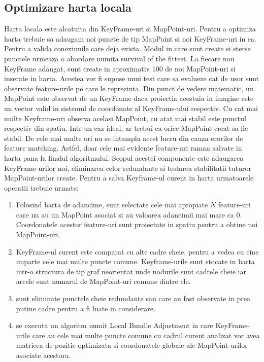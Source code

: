 \documentclass[12pt,a4paper]{report}
\begin{document}
\subsection{Optimizare harta locala}
Harta locala este alcatuita din KeyFrame-uri si MapPoint-uri. Pentru a optimiza
harta trebuie sa adaugam noi puncte de tip MapPoint si noi KeyFrame-uri in ea.
Pentru a valida conexiunile care deja exista. Modul in care sunt create si sterse 
punctele urmeaza o abordare numita survival of the fittest. La fiecare nou KeyFrame 
adaugat, sunt create in aproximativ 100 de noi MapPoint-uri si inserate in harta. Acestea
vor fi supuse unui test care sa evalueze cat de usor sunt observate feature-urile pe care
le reprezinta.  Din punct de vedere matematic, un MapPoint este observat de un KeyFrame
daca proiectia acestuia in imagine este un vector valid in sistemul de coordonate 
al KeyFrame-ului respectiv. Cu cat mai multe Keyframe-uri observa acelasi MapPoint,
cu atat mai stabil este punctul respectiv din spatiu. Intr-un caz ideal, ar trebui ca
orice MapPoint creat sa fie stabil. De cele mai multe ori nu se intampla acest lucru din
cauza erorilor de feature matching. Astfel, doar cele mai evidente feature-uri raman 
salvate in harta pana la finalul algoritmului. Scopul acestei componente este adaugarea 
KeyFrame-urilor noi, eliminarea celor redundante si testarea stabilitatii tuturor MapPoint-urilor
create. Pentru a salva Keyframe-ul curent in harta urmatoarele operatii trebuie urmate:
\begin{enumerate}
    \item Folosind harta de adancime, sunt selectate cele mai apropiate \( N \) feature-uri 
    care nu au un MapPoint asociat si au valoarea adancimii mai mare ca 0.
    Coordonatele acestor feature-uri sunt proiectate in spatiu pentru a obtine noi MapPoint-uri.      
    \item KeyFrame-ul curent este comparat cu alte cadre cheie, pentru a vedea cu cine imparte 
    cele mai multe puncte comune. Keyframe-urile sunt stocate in harta intr-o structura de tip 
    graf neorientat unde nodurile sunt cadrele cheie iar arcele sunt numarul de MapPoint-uri comune 
    dintre ele.
    \item sunt eliminate punctele cheie redundante sau care au fost observate in prea putine 
    cadre pentru a fi luate in considerare.
    \item se executa un algoritm numit Local Bundle Adjustment in care KeyFrame-urile 
    care au cele mai multe puncte comune cu cadrul curent analizat vor avea matricea de
    pozitie optimizata si coordonatele globale ale MapPoint-urilor asociate acestora.
\end{enumerate} 
 
\end{document}
